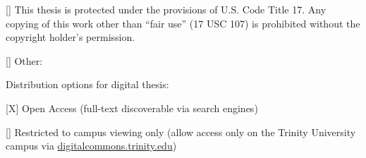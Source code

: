 \begin{singlespace}
\begin{small}
\begin{TitlePageList}
\item{[\hspace*{\WidthOfX}]}
This thesis is protected under the provisions of U.S. Code Title 17.
Any copying of this work other than ``fair use'' (17 USC 107)
is prohibited without the copyright holder's permission.

\item{[\hspace*{\WidthOfX}]}
Other:

\end{TitlePageList}

\vspace*{2\baselineskip}

\noindent
Distribution options for digital thesis:

\begin{TitlePageList}

\item{[X]}
Open Access (full-text discoverable via search engines)

\item{[\hspace*{\WidthOfX}]}
Restricted to campus viewing only (allow access only on the Trinity
University campus via \url{digitalcommons.trinity.edu})

\end{TitlePageList}

\end{small}

\end{singlespace}
